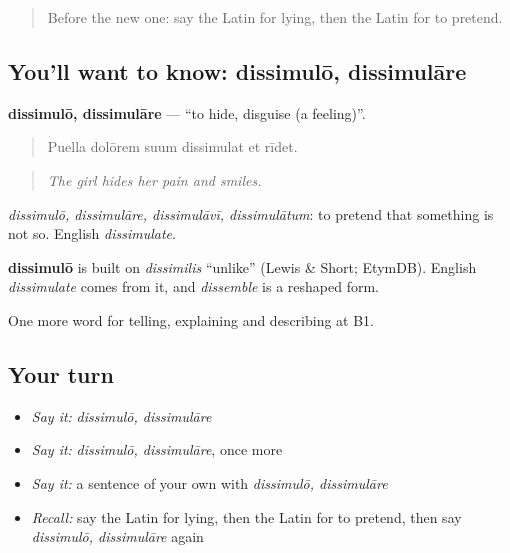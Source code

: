 \label{lesson:LA-C504-dissimulo}



\begin{quote}
Before the new one: say the Latin for lying, then the Latin for to pretend.
\end{quote}

\subsection*{You'll want to know: dissimulō, dissimulāre}
\textbf{dissimulō, dissimulāre} — \textquotedblleft{}to hide, disguise (a feeling)\textquotedblright{}.

\begin{quote}
Puella dolōrem suum dissimulat et rīdet.
\end{quote}

\begin{quote}
\emph{The girl hides her pain and smiles.}
\end{quote}

\emph{dissimulō, dissimulāre, dissimulāvī, dissimulātum}: to pretend that something is not so. English \emph{dissimulate}.

\begin{cousinweb}
\textbf{dissimulō} is built on \emph{dissimilis} \textquotedblleft{}unlike\textquotedblright{} (Lewis \& Short; EtymDB). English \emph{dissimulate} comes from it, and \emph{dissemble} is a reshaped form.
\end{cousinweb}

\begin{grammarlens}[title={What you've built}]
One more word for telling, explaining and describing at B1.
\end{grammarlens}

\subsection*{Your turn}
\begin{itemize}
\raggedright
  \item \emph{Say it:} \emph{dissimulō, dissimulāre}
  \item \emph{Say it:} \emph{dissimulō, dissimulāre}, once more
  \item \emph{Say it:} a sentence of your own with \emph{dissimulō, dissimulāre}
  \item \emph{Recall:} say the Latin for lying, then the Latin for to pretend, then say \emph{dissimulō, dissimulāre} again
\end{itemize}

